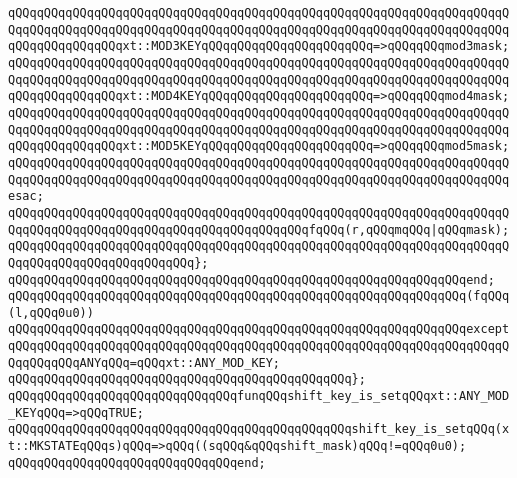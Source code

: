 \verb|qQQqqQQqqQQqqQQqqQQqqQQqqQQqqQQqqQQqqQQqqQQqqQQqqQQqqQQqqQQqqQQqqQQqqQQqqQQqqQQqqQQqqQQqqQQqqQQqqQQqqQQqqQQqqQQqqQQqqQQqqQQqqQQqqQQqqQQqqQQqqQQqqQQqqQQqqQQqxt::MOD3KEYqQQqqQQqqQQqqQQqqQQqqQQq=>qQQqqQQqmod3mask;|\newline
\verb|qQQqqQQqqQQqqQQqqQQqqQQqqQQqqQQqqQQqqQQqqQQqqQQqqQQqqQQqqQQqqQQqqQQqqQQqqQQqqQQqqQQqqQQqqQQqqQQqqQQqqQQqqQQqqQQqqQQqqQQqqQQqqQQqqQQqqQQqqQQqqQQqqQQqqQQqqQQqxt::MOD4KEYqQQqqQQqqQQqqQQqqQQqqQQq=>qQQqqQQqmod4mask;|\newline
\verb|qQQqqQQqqQQqqQQqqQQqqQQqqQQqqQQqqQQqqQQqqQQqqQQqqQQqqQQqqQQqqQQqqQQqqQQqqQQqqQQqqQQqqQQqqQQqqQQqqQQqqQQqqQQqqQQqqQQqqQQqqQQqqQQqqQQqqQQqqQQqqQQqqQQqqQQqqQQqxt::MOD5KEYqQQqqQQqqQQqqQQqqQQqqQQq=>qQQqqQQqmod5mask;|\newline
\verb|qQQqqQQqqQQqqQQqqQQqqQQqqQQqqQQqqQQqqQQqqQQqqQQqqQQqqQQqqQQqqQQqqQQqqQQqqQQqqQQqqQQqqQQqqQQqqQQqqQQqqQQqqQQqqQQqqQQqqQQqqQQqqQQqqQQqqQQqqQQqesac;|\newline
\newline
\verb|qQQqqQQqqQQqqQQqqQQqqQQqqQQqqQQqqQQqqQQqqQQqqQQqqQQqqQQqqQQqqQQqqQQqqQQqqQQqqQQqqQQqqQQqqQQqqQQqqQQqqQQqqQQqqQQqfqQQq(r,qQQqmqQQq|\verb#|qQQqmask);#\newline
\verb|qQQqqQQqqQQqqQQqqQQqqQQqqQQqqQQqqQQqqQQqqQQqqQQqqQQqqQQqqQQqqQQqqQQqqQQqqQQqqQQqqQQqqQQqqQQqqQQq};|\newline
\verb|qQQqqQQqqQQqqQQqqQQqqQQqqQQqqQQqqQQqqQQqqQQqqQQqqQQqqQQqqQQqqQQqend;|\newline
\newline
\verb|qQQqqQQqqQQqqQQqqQQqqQQqqQQqqQQqqQQqqQQqqQQqqQQqqQQqqQQqqQQqqQQq(fqQQq(l,qQQq0u0))|\newline
\verb|qQQqqQQqqQQqqQQqqQQqqQQqqQQqqQQqqQQqqQQqqQQqqQQqqQQqqQQqqQQqqQQqexcept|\newline
\verb|qQQqqQQqqQQqqQQqqQQqqQQqqQQqqQQqqQQqqQQqqQQqqQQqqQQqqQQqqQQqqQQqqQQqqQQqqQQqqQQqANYqQQq=qQQqxt::ANY_MOD_KEY;|\newline
\verb|qQQqqQQqqQQqqQQqqQQqqQQqqQQqqQQqqQQqqQQqqQQqqQQq};|\newline
\newline
\verb|qQQqqQQqqQQqqQQqqQQqqQQqqQQqqQQqfunqQQqshift_key_is_setqQQqxt::ANY_MOD_KEYqQQq=>qQQqTRUE;|\newline
\verb|qQQqqQQqqQQqqQQqqQQqqQQqqQQqqQQqqQQqqQQqqQQqqQQqshift_key_is_setqQQq(xt::MKSTATEqQQqs)qQQq=>qQQq((sqQQq&qQQqshift_mask)qQQq!=qQQq0u0);|\newline
\verb|qQQqqQQqqQQqqQQqqQQqqQQqqQQqqQQqend;|\newline
\newline
